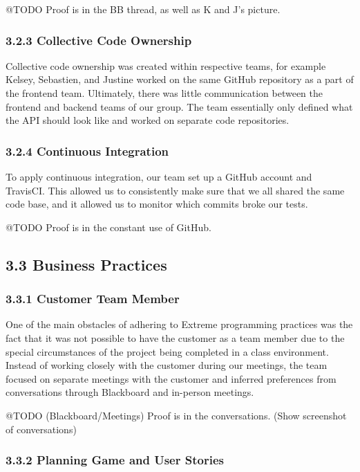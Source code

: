 \documentclass[]{article}
\begin{document}
@TODO Proof is in the BB thread, as well as K and J's picture.

\subsubsection{3.2.3 Collective Code
Ownership}\label{collective-code-ownership}

Collective code ownership was created within respective teams, for
example Kelsey, Sebastien, and Justine worked on the same GitHub
repository as a part of the frontend team. Ultimately, there was little
communication between the frontend and backend teams of our group. The
team essentially only defined what the API should look like and worked
on separate code repositories.

\subsubsection{3.2.4 Continuous
Integration}\label{continuous-integration}

To apply continuous integration, our team set up a GitHub account and
TravisCI. This allowed us to consistently make sure that we all shared
the same code base, and it allowed us to monitor which commits broke our
tests.

@TODO Proof is in the constant use of GitHub.

\subsection{3.3 Business Practices}\label{business-practices}

\subsubsection{3.3.1 Customer Team Member}\label{customer-team-member}

One of the main obstacles of adhering to Extreme programming practices
was the fact that it was not possible to have the customer as a team
member due to the special circumstances of the project being completed
in a class environment. Instead of working closely with the customer
during our meetings, the team focused on separate meetings with the
customer and inferred preferences from conversations through Blackboard
and in-person meetings.

@TODO (Blackboard/Meetings) Proof is in the conversations. (Show
screenshot of conversations)

\subsubsection{3.3.2 Planning Game and User
Stories}\label{planning-game-and-user-stories}
\end{document}
